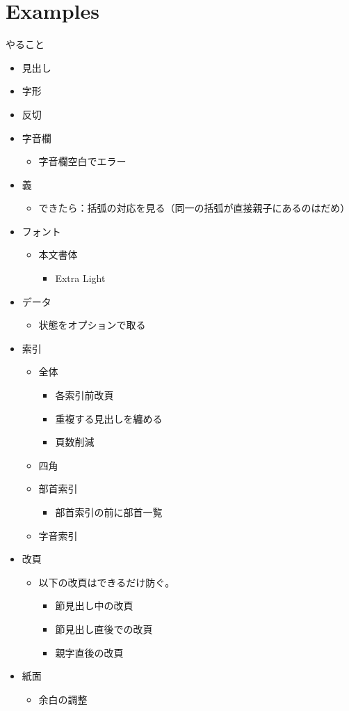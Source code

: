 \documentclass[a5paper,10pt,twoside]{article}
\begin{document}
\part{Examples}
やること
\begin{itemize}
\item{} 見出し
\item 字形
\item{} 反切
\item{} 字音欄
  \begin{itemize}
  \item{} 字音欄空白でエラー
  \end{itemize}
\item{} 義
  \begin{itemize}
  \item できたら：括弧の対応を見る（同一の括弧が直接親子にあるのはだめ）
  \end{itemize}
\item{} フォント
  \begin{itemize}
  \item{} 本文書体
    \begin{itemize}
    \item{} Extra Light
    \end{itemize}
  \end{itemize}
\item{} データ
  \begin{itemize}
  \item{} 状態をオプションで取る
  \end{itemize}
\item{} 索引
  \begin{itemize}
  \item{} 全体
    \begin{itemize}
    \item{} 各索引前改頁
    \item{} 重複する見出しを纏める
    \item{} 頁数削減
    \end{itemize}
  \item{} 四角
  \item{} 部首索引
    \begin{itemize}
    \item 部首索引の前に部首一覧
    \end{itemize}
  \item{} 字音索引
  \end{itemize}
\item{} 改頁
  \begin{itemize}
  \item{} 以下の改頁はできるだけ防ぐ。
    \begin{itemize}
    \item{} 節見出し中の改頁
    \item{} 節見出し直後での改頁
    \item{} 親字直後の改頁
    \end{itemize}
  \end{itemize}
\item{} 紙面
  \begin{itemize}
  \item{} 余白の調整
  \end{itemize}
\end{itemize}
\end{document}
